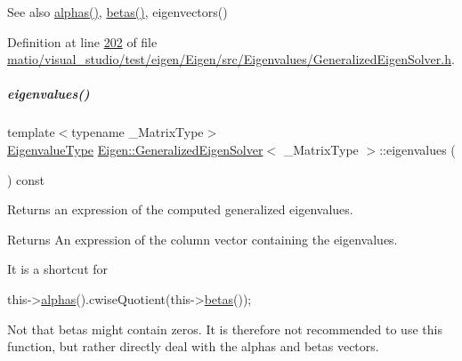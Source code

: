 \begin{DoxySeeAlso}{See also}
\hyperlink{group___eigenvalues___module_a82b1bc41267f46e5c5899d5b084a73bb}{alphas()}, \hyperlink{group___eigenvalues___module_abeaa6f56cee367b83fd09d428462ca0c}{betas()}, eigenvectors() 
\end{DoxySeeAlso}


Definition at line \hyperlink{matio_2visual__studio_2test_2eigen_2_eigen_2src_2_eigenvalues_2_generalized_eigen_solver_8h_source_l00202}{202} of file \hyperlink{matio_2visual__studio_2test_2eigen_2_eigen_2src_2_eigenvalues_2_generalized_eigen_solver_8h_source}{matio/visual\+\_\+studio/test/eigen/\+Eigen/src/\+Eigenvalues/\+Generalized\+Eigen\+Solver.\+h}.

\mbox{\label{group___eigenvalues___module_a62f01cd78271efd5e39bcb24e0fe1a58}} 
\subparagraph{\texorpdfstring{eigenvalues()}{eigenvalues()}\hspace{0.1cm}{\footnotesize\ttfamily [2/2]}}
{\footnotesize\ttfamily template$<$typename \+\_\+\+Matrix\+Type$>$ \\
\hyperlink{group___eigenvalues___module_ad59af178acc401f1bc4e330ef80f286d}{Eigenvalue\+Type} \hyperlink{group___eigenvalues___module_class_eigen_1_1_generalized_eigen_solver}{Eigen\+::\+Generalized\+Eigen\+Solver}$<$ \+\_\+\+Matrix\+Type $>$\+::eigenvalues (\begin{DoxyParamCaption}{ }\end{DoxyParamCaption}) const\hspace{0.3cm}{\ttfamily [inline]}}



Returns an expression of the computed generalized eigenvalues. 

\begin{DoxyReturn}{Returns}
An expression of the column vector containing the eigenvalues.
\end{DoxyReturn}
It is a shortcut for
\begin{DoxyCode}
this->\hyperlink{group___eigenvalues___module_a82b1bc41267f46e5c5899d5b084a73bb}{alphas}().cwiseQuotient(this->\hyperlink{group___eigenvalues___module_abeaa6f56cee367b83fd09d428462ca0c}{betas}()); 
\end{DoxyCode}
 Not that betas might contain zeros. It is therefore not recommended to use this function, but rather directly deal with the alphas and betas vectors.

